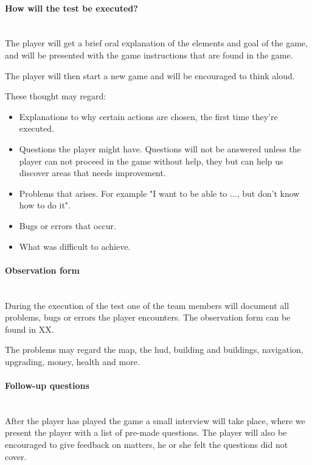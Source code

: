 \paragraph{How will the test be executed?}\mbox{}\\

The player will get a brief oral explanation of the elements and goal of the game, 
and will be presented with the game instructions that are found in the game.

The player will then start a new game and will be encouraged to think aloud. 

These thought may regard:

\begin{itemize}
  \item Explanations to why certain actions are chosen, the first time they're executed.
  \item Questions the player might have. Questions will not be answered unless the player can not proceed in the game without help, they but can help us discover areas that needs improvement.
  \item Problems that arises. For example "I want to be able to ..., but don't know how to do it". 
  \item Bugs or errors that occur.
  \item What was difficult to achieve.
\end{itemize}

\paragraph{Observation form}\mbox{}\\

During the execution of the test one of the team members will document all problems, bugs or errors the player encounters.
The observation form can be found in XX.

The problems may regard the map, the hud, building and buildings, navigation, upgrading, money, health and more.

\paragraph{Follow-up questions}\mbox{}\\

After the player has played the game a small interview will take place, where we present the player with a list of pre-made questions. The player will also be encouraged to give feedback on matters, he or she felt the questions did not cover.

